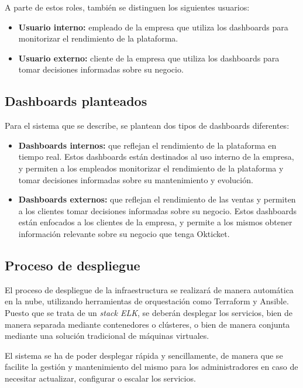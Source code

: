 A parte de estos roles, también se distinguen los siguientes usuarios:

\begin{itemize}
	\item \textbf{Usuario interno:} empleado de la empresa que utiliza los
		dashboards para monitorizar el rendimiento de la plataforma.
	\item \textbf{Usuario externo:} cliente de la empresa que utiliza los
		dashboards para tomar decisiones informadas sobre su negocio.
\end{itemize}


\newpage{}
\subsection{Dashboards planteados}
Para el sistema que se describe, se plantean dos tipos de dashboards diferentes:

\begin{itemize}
	\item \textbf{Dashboards internos:} que reflejan el rendimiento de la
		plataforma en tiempo real. Estos dashboards están destinados al uso
		interno de la empresa, y permiten a los empleados monitorizar el
		rendimiento de la plataforma y tomar decisiones informadas sobre su
		mantenimiento y evolución.
	\item \textbf{Dashboards externos:} que reflejan el rendimiento de las
		ventas y permiten a los clientes tomar decisiones informadas sobre su
		negocio. Estos dashboards están enfocados a los clientes de la empresa,
		y permite a los mismos obtener información relevante sobre su negocio
		que tenga Okticket.
\end{itemize}


\subsection{Proceso de despliegue}
El proceso de despliegue de la infraestructura se realizará de manera automática
en la nube, utilizando herramientas de orquestación como Terraform y Ansible.
Puesto que se trata de un \textit{stack ELK}, se deberán desplegar los servicios,
bien de manera separada mediante contenedores o clústeres, o bien de manera
conjunta mediante una solución tradicional de máquinas virtuales.

El sistema se ha de poder desplegar rápida y sencillamente, de manera que se
facilite la gestión y mantenimiento del mismo para los administradores en caso
de necesitar actualizar, configurar o escalar los servicios.

